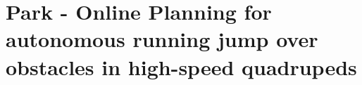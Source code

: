 \section{Park - Online Planning for autonomous running jump over obstacles in high-speed quadrupeds}